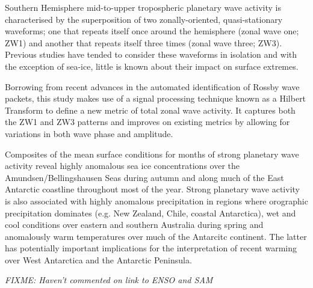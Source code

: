 Southern Hemisphere mid-to-upper tropospheric planetary wave activity is characterised by the superposition of two zonally-oriented, quasi-stationary waveforms; one that repeats itself once around the hemisphere (zonal wave one; ZW1) and another that repeats itself three times (zonal wave three; ZW3). Previous studies have tended to consider these waveforms in isolation and with the exception of sea-ice, little is known about their impact on surface extremes. 

Borrowing from recent advances in the automated identification of Rossby wave packets, this study makes use of a signal processing technique known as a Hilbert Transform to define a new metric of total zonal wave activity. It captures both the ZW1 and ZW3 patterns and improves on existing metrics by allowing for variations in both wave phase and amplitude.

Composites of the mean surface conditions for months of strong planetary wave activity reveal highly anomalous sea ice concentrations over the Amundsen/Bellingshausen Seas during autumn and along much of the East Antarctic coastline throughout most of the year. Strong planetary wave activity is also associated with highly anomalous precipitation in regions where orographic precipitation dominates (e.g. New Zealand, Chile, coastal Antarctica), wet and cool conditions over eastern and southern Australia during spring and anomalously warm temperatures over much of the Antarcitc continent. The latter has potentially important implications for the interpretation of recent warming over West Antarctica and the Antarctic Peninsula.

\textit{FIXME: Haven't commented on link to ENSO and SAM}

